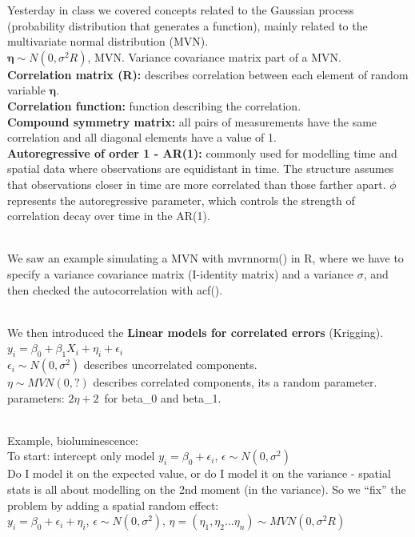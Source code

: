 \documentclass[
]{book}
\begin{document}
Yesterday in class we covered concepts related to the Gaussian process (probability distribution that generates a function), mainly related to the multivariate normal distribution (MVN).\\
\(\boldsymbol{\eta} \sim N(0, \sigma^2R)\), MVN. Variance covariance matrix part of a MVN.\\
\textbf{Correlation matrix (R):} describes correlation between each element of random variable \(\boldsymbol{\eta}\).\\
\textbf{Correlation function:} function describing the correlation.\\
\textbf{Compound symmetry matrix:} all pairs of measurements have the same correlation and all diagonal elements have a value of 1.\\
\textbf{Autoregressive of order 1 - AR(1):} commonly used for modelling time and spatial data where observations are equidistant in time. The structure assumes that observations closer in time are more correlated than those farther apart. \(\phi\) represents the autoregressive parameter, which controls the strength of correlation decay over time in the AR(1).\\
\strut \\
We saw an example simulating a MVN with mvrnnorm() in R, where we have to specify a variance covariance matrix (I-identity matrix) and a variance \(\sigma\), and then checked the autocorrelation with acf().\\
\strut \\
We then introduced the \textbf{Linear models for correlated errors} (Krigging).\\
\(y_i=\beta_0+\beta_1X_i+\eta_i+\epsilon_i\)\\
\(\epsilon_i \sim N(0,\sigma^2)\) describes uncorrelated components.\\
\(\eta \sim MVN(0, ?)\) describes correlated components, its a random parameter.\\
parameters: \(2\eta+2\)~for beta\_0 and beta\_1.\\
\strut \\
Example, bioluminescence:\\
To start: intercept only model \(y_i=\beta_0+\epsilon_i\), \(\epsilon \sim N(0, \sigma^2)\)\\
Do I model it on the expected value, or do I model it on the variance - spatial stats is all about modelling on the 2nd moment (in the variance). So we ``fix'' the problem by adding a spatial random effect:\\
\(y_i=\beta_0+\epsilon_i+\eta_i\), \(\epsilon \sim N(0, \sigma^2)\), \(\eta=(\eta_1, \eta_2...\eta_n) \sim MVN(0, \sigma^2R)\)\\
\end{document}
